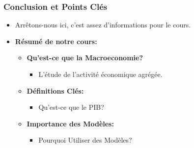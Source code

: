 \documentclass{beamer}
\begin{document}
\begin{frame}
    \frametitle{Conclusion et Points Clés}

    \begin{itemize}
        \item Arrêtons-nous ici, c'est assez d'informations pour le cours.
        \pause
        \item \textbf{Résumé de notre cours:}
            \begin{itemize}
                \item \textbf{Qu'est-ce que la Macroeconomie?} 
                \begin{itemize}
                    \item L'étude de l'activité économique agrégée.
                \end{itemize}
                \pause
                \item \textbf{Définitions Clés:}
                \begin{itemize}
                    \item Qu'est-ce que le PIB?
                \end{itemize}
                \pause
                \item \textbf{Importance des Modèles:}
                \begin{itemize}
                    \item Pourquoi Utiliser des Modèles?
                \end{itemize}
            \end{itemize}
    \end{itemize}
\end{frame}
\end{document}
